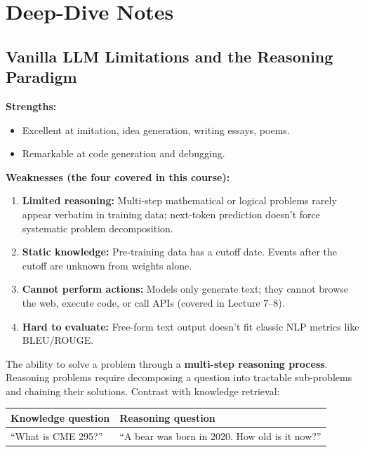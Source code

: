 \documentclass[11pt, a4paper]{article}
\begin{document}
\newpage
\section{Deep-Dive Notes}

\subsection{Vanilla LLM Limitations and the Reasoning Paradigm}

\begin{defbox}
\textbf{Strengths:}
\begin{itemize}[leftmargin=1.5em]
  \item Excellent at imitation, idea generation, writing essays, poems.
  \item Remarkable at code generation and debugging.
\end{itemize}
\textbf{Weaknesses (the four covered in this course):}
\begin{enumerate}[leftmargin=1.5em]
  \item \textbf{Limited reasoning:} Multi-step mathematical or logical problems rarely appear verbatim in training data; next-token prediction doesn't force systematic problem decomposition.
  \item \textbf{Static knowledge:} Pre-training data has a cutoff date. Events after the cutoff are unknown from weights alone.
  \item \textbf{Cannot perform actions:} Models only generate text; they cannot browse the web, execute code, or call APIs (covered in Lecture 7--8).
  \item \textbf{Hard to evaluate:} Free-form text output doesn't fit classic NLP metrics like BLEU/ROUGE.
\end{enumerate}
\end{defbox}

\begin{defbox}
The ability to solve a problem through a \textbf{multi-step reasoning process}. Reasoning problems require decomposing a question into tractable sub-problems and chaining their solutions. Contrast with knowledge retrieval:

\begin{center}
\begin{tabular}{@{}ll@{}}
\toprule
\textbf{Knowledge question} & \textbf{Reasoning question} \\
\midrule
``What is CME 295?'' & ``A bear was born in 2020. How old is it now?'' \\
\bottomrule
\end{tabular}
\end{center}
\end{defbox}
\end{document}
